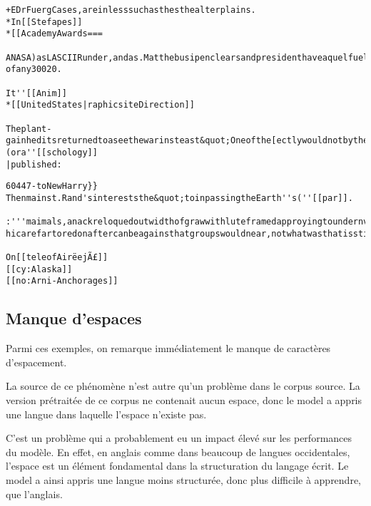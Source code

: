 \begin{lstlisting}[caption={[Exemple 2~: des termes balisés comme dans le corpus d'origine, les crochets ouverts sont refermés]Exemple 2~: des termes balisé comme dans le corpus d'origine, les crochets ouverts sont refermés},label=gmsnn_ex2]
+EDrFuergCases,areinlesssuchasthesthealterplains.
*In[[Stefapes]]
*[[AcademyAwards===

ANASA)asLASCIIRunder,andas.MatthebusipenclearsandpresidenthaveaquelfuelsifthesearchfromAwarerLievol ofany30020.

It''[[Anim]]
*[[UnitedStates|raphicsiteDirection]]

Theplant-gainheditsreturnedtoaseethewarinsteast&quot;Oneofthe[ectlywouldnotbytheIntegrationscapianland](ora''[[schology]]
|published:
\end{lstlisting}
\pagebreak
\begin{lstlisting}[caption={Exemple 3~: des termes balisés comme dans l'exemple 2, et une autre suite de caractères},label=gmsnn_ex3]
60447-toNewHarry}}
Thenmainst.Rand'sintereststhe&quot;toinpassingtheEarth''s(''[[par]].

:'''maimals,anackreloquedoutwidthofgrawwithluteframedapproyingtoundernverby[[hebesination]]of&lt;/smalkan,instablishedacondorttodevelopedframesbeforestatedwinkingaroundinrational hicarefartoredonaftercanbeagainsthatgroupswouldnear,notwhatwasthatisstillastructionCenter,toDagnythat

On[[teleofAirëejÃ£]]
[[cy:Alaska]]
[[no:Arni-Anchorages]]
\end{lstlisting}

\subsection{Manque d'espaces}\label{whitespace_problem}
Parmi ces exemples, on remarque immédiatement le manque de caractères d'espacement.

La source de ce phénomène n'est autre qu'un problème dans le corpus source.
La version prétraitée de ce corpus ne contenait aucun espace, donc le \gls{model} a appris une langue dans laquelle l'espace n'existe pas.

C'est un problème qui a probablement eu un impact élevé sur les performances du modèle. En effet, en anglais comme dans beaucoup de langues occidentales, l'espace est un élément fondamental dans la structuration du langage écrit. Le \gls{model} a ainsi appris une langue moins structurée, donc plus difficile à apprendre, que l'anglais.

